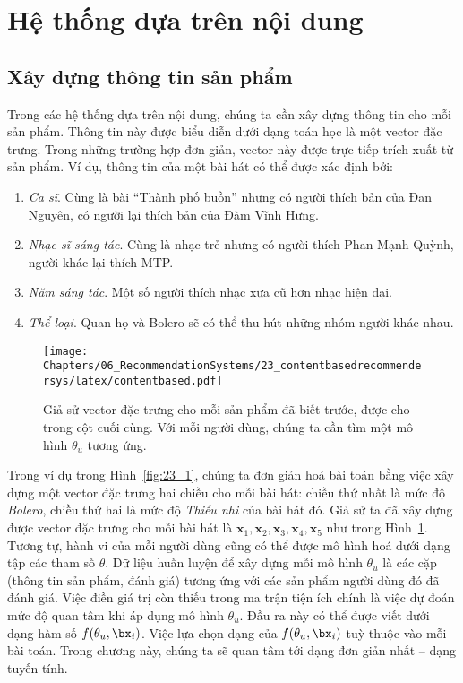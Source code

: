  
\section{Hệ thống dựa trên nội dung}
 
 
\subsection{Xây dựng thông tin sản phẩm}
 
Trong các hệ thống dựa trên nội dung, chúng ta cần xây dựng thông tin cho mỗi sản phẩm. Thông tin này được biểu diễn
dưới dạng toán học là một vector đặc trưng. Trong những trường hợp đơn giản,
vector này được trực tiếp trích xuất từ sản phẩm. Ví dụ, thông tin của một bài hát có thể được xác định bởi:
\begin{enumerate}
    \item \textit{Ca sĩ}. Cùng là bài ``{Thành phố buồn}'' nhưng có người thích bản của Đan Nguyên, có người lại thích bản của Đàm Vĩnh Hưng.  
    \item \textit{Nhạc sĩ sáng tác}. Cùng là nhạc trẻ nhưng có người thích Phan Mạnh Quỳnh, người khác lại thích MTP.  
    \item \textit{Năm sáng tác}. Một số người thích nhạc xưa cũ hơn nhạc hiện đại.  
    \item \textit{Thể loại}. Quan họ và Bolero sẽ có thể thu hút những nhóm người khác nhau.  
\end{enumerate}
 
\begin{figure}[t]
\centering
    \texttt{[image: Chapters/06\_RecommendationSystems/23\_contentbasedrecommendersys/latex/contentbased.pdf]}
    \caption[]{Giả sử vector đặc trưng cho mỗi sản phẩm đã biết trước, được cho trong cột cuối
    cùng. Với mỗi người dùng, chúng ta cần tìm một mô hình \(\theta_u\) tương
    ứng.}
    \label{fig:23_2}
\end{figure}
Trong ví dụ trong Hình~\ref{fig:23_1}, chúng ta đơn giản hoá bài toán bằng việc
xây dựng một vector đặc trưng hai chiều cho mỗi bài hát: chiều thứ nhất là mức
độ \textit{Bolero}, chiều thứ hai là mức độ \textit{Thiếu nhi} của bài hát đó.
Giả sử ta đã xây dựng được vector đặc trưng cho mỗi bài hát là $\mathbf{x}_1, \mathbf{x}_2,
\mathbf{x}_3, \mathbf{x}_4, \mathbf{x}_5$ như trong Hình~\ref{fig:23_2}. Tương
tự, hành vi của mỗi người dùng cũng có thể được mô hình hoá dưới dạng tập các
tham số $\theta$. Dữ liệu huấn luyện để xây dựng mỗi mô hình $\theta_u$ là các
cặp (thông tin sản phẩm, đánh giá) tương ứng với các sản phẩm người dùng đó đã đánh giá. Việc điền giá trị còn thiếu trong ma trận
tiện ích chính là việc dự đoán mức độ quan tâm khi áp dụng mô hình $\theta_u$. Đầu ra này có thể được viết dưới dạng hàm số $f(\theta_u,
\bx_i)$. Việc lựa chọn dạng của $f(\theta_u, \bx_i)$ tuỳ thuộc vào mỗi bài toán.
Trong chương này, chúng ta sẽ quan tâm tới dạng đơn giản nhất -- dạng tuyến tính.

